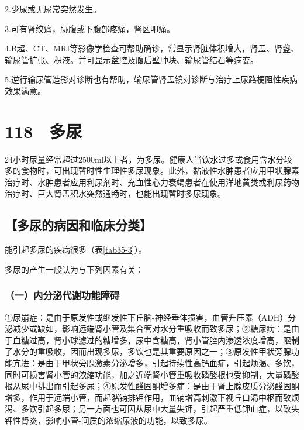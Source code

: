 2.少尿或无尿常突然发生。

3.可有肾绞痛，胁腹或下腹部疼痛，肾区叩痛。

4.B超、CT、MRI等影像学检查可帮助确诊，常显示肾脏体积增大，肾盂、肾盏、输尿管扩张、积液。并可显示盆腔及腹后壁肿块、输尿管结石等病变。

5.逆行输尿管造影对诊断也有帮助，输尿管肾盂镜对诊断与治疗上尿路梗阻性疾病效果满意。

\protect\hypertarget{text00273.html}{}{}

\section{118　多尿}

24小时尿量经常超过2500ml以上者，为多尿。健康人当饮水过多或食用含水分较多的食物时，可出现暂时性生理性多尿现象。此外，黏液性水肿患者应用甲状腺素治疗时、水肿患者应用利尿剂时、充血性心力衰竭患者在使用洋地黄类或利尿药物治疗时、巨大肾盂积水突然通畅时，也能出现暂时多尿现象。

\subsection{【多尿的病因和临床分类】}

能引起多尿的疾病很多（表\ref{tab35-3}）。

多尿的产生一般认为与下列因素有关：

\subsubsection{（一）内分泌代谢功能障碍}

①尿崩症：是由于原发性或继发性下丘脑-神经垂体损害，血管升压素（ADH）分泌减少或缺如，影响远端肾小管及集合管对水分重吸收而致多尿；②糖尿病：是由于血糖过高，肾小球滤过的糖增多，尿中含糖高，肾小管腔内渗透浓度增高，限制了水分的重吸收，因而出现多尿，多饮也是其重要原因之一；③原发性甲状旁腺功能亢进：是由于甲状旁腺激素分泌增多，引起持续性高钙血症，引起烦渴、多饮，同时可损害肾小管的浓缩功能，加之近端肾小管重吸收磷酸根也受抑制，大量磷酸根从尿中排出而引起多尿；④原发性醛固酮增多症：是由于肾上腺皮质分泌醛固酮增多，作用于远端小管，而起潴钠排钾作用，血钠增高刺激下视丘口渴中枢而致烦渴、多饮引起多尿；另一方面也可因从尿中大量失钾，引起严重低钾血症，以致失钾性肾炎，影响小管-间质的浓缩尿液的功能，以致多尿。

